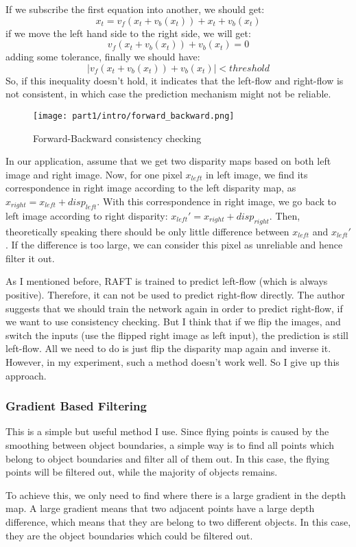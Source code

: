 \documentclass[12pt]{article}
\begin{document}
If we subscribe the first equation into another, we should get:$$x_t=v_f(x_t+v_b(x_t))+x_t+v_b(x_t)$$if we move the left hand side to the right side, we will get:$$v_f(x_t+v_b(x_t))+v_b(x_t)=0$$adding some tolerance, finally we should have:
$$|v_f(x_t+v_b(x_t))+v_b(x_t)|<threshold$$So, if this inequality doesn't hold, it indicates that the left-flow and right-flow is not consistent, in which case the prediction mechanism might not be reliable.
\begin{figure}[H]
    \centering
    \texttt{[image: part1/intro/forward\_backward.png]}
    \caption{Forward-Backward consistency checking}
    \label{forward_backward}
\end{figure}
In our application, assume that we get two disparity maps based on both left image and right image. Now, for one pixel $x_{left}$ in left image, we find its correspondence in right image according to the left disparity map, as $x_{right}=x_{left}+disp_{left}$. With this correspondence in right image, we go back to left image according to right disparity: $x_{left}'=x_{right}+disp_{right}$. Then, theoretically speaking there should be only little difference between $x_{left}$ and $x_{left}'$. If the difference is too large, we can consider this pixel as unreliable and hence filter it out.

As I mentioned before, RAFT is trained to predict left-flow (which is always positive). Therefore, it can not be used to predict right-flow directly. The author suggests that we should train the network again in order to predict right-flow, if we want to use consistency checking. But I think that if we flip the images, and switch the inputs (use the flipped right image as left input), the prediction is still left-flow. All we need to do is just flip the disparity map again and inverse it. However, in my experiment, such a method doesn't work well. So I give up this approach.
\subsubsection{Gradient Based Filtering}
This is a simple but useful method I use. Since flying points is caused by the smoothing between object boundaries, a simple way is to find all points which belong to object boundaries and filter all of them out. In this case, the flying points will be filtered out, while the majority of objects remains.

To achieve this, we only need to find where there is a large gradient in the depth map. A large gradient means that two adjacent points have a large depth difference, which means that they are belong to two different objects. In this case, they are the object boundaries which could be filtered out.
\end{document}

